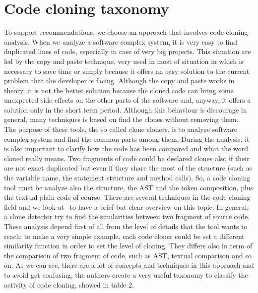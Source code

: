 \section{Code cloning taxonomy}
To support recommendations, we choose an approach that involves code cloning analysis. When we analyze a software complex system, it is very easy to find duplicated lines of code, especially in case of very big projects. This situation are led by the copy and paste technique, very used in most of situation in which is necessary to save time or simply because it offers an easy solution to the current problem that the developer is facing. Although the copy and paste works in theory, it is not the better solution because the cloned code can bring some unexpected side effects on the other parts of the software and, anyway, it offers a solution only in the short term period. Although this behaviour is discourage in general, many techniques is based on find the clones without removing them. \\
The purpose of these tools, the so called clone cloners, is to analyze software complex system and find the common parts among them. During the analysis, it is also important to clarify how the code has been compared and what the word cloned really means. Two fragments of code could be declared clones also if their are not exact duplicated but even if they share the most of the structure (such as the variable name, the statement structure and method calls). So, a code cloning tool must be analyze also the structure, the AST and the token composition, plus the textual plain code of course. There are several techniques in the code cloning field and we look at~\cite{chanchal_k._roy_comparison_2009} to have a brief but clear overview on this topic. In general, a clone detector try to find the similarities between two fragment of source code. These analysis depend first of all from the level of details that the tool wants to reach: to make a very simple example, each code cloner could be set a different similarity function in order to set the level of cloning. They differs also in term of the comparison of two fragment of code, such as AST, textual comparison and so on. As we can see, there are a lot of concepts and techniques in this approach and to avoid get confusing, the authors create a very useful taxonomy to classify the activity of code cloning, showed in table 2.

